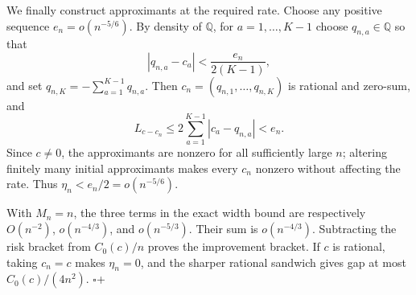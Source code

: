 We finally construct approximants at the required rate.  Choose any positive sequence \(e_n=o(n^{-5/6})\).  By density of \(\mathbb Q\), for \(a=1,\ldots,K-1\) choose \(q_{n,a}\in\mathbb Q\) so that
\[
 |q_{n,a}-c_a|<\frac{e_n}{2(K-1)},
\]
and set \(q_{n,K}=-\sum_{a=1}^{K-1}q_{n,a}\).  Then \(c_n=(q_{n,1},\ldots,q_{n,K})\) is rational and zero-sum, and
\[
 L_{c-c_n}\leq2\sum_{a=1}^{K-1}|c_a-q_{n,a}|<e_n.
\]
Since \(c\neq0\), the approximants are nonzero for all sufficiently large \(n\); altering finitely many initial approximants makes every \(c_n\) nonzero without affecting the rate.  Thus \(\eta_n<e_n/2=o(n^{-5/6})\).

With \(M_n=n\), the three terms in the exact width bound are respectively \(O(n^{-2})\), \(o(n^{-4/3})\), and \(o(n^{-5/3})\).  Their sum is \(o(n^{-4/3})\).  Subtracting the risk bracket from \(C_0(c)/n\) proves the improvement bracket.  If \(c\) is rational, taking \(c_n=c\) makes \(\eta_n=0\), and the sharper rational sandwich gives gap at most \(C_0(c)/(4n^2)\). \(\square\)+